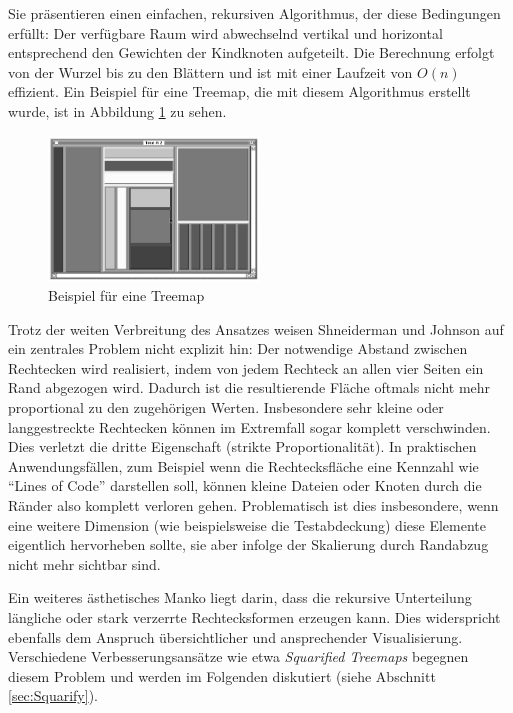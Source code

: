 Sie präsentieren einen einfachen, rekursiven Algorithmus, der diese Bedingungen erfüllt: Der verfügbare Raum wird abwechselnd vertikal und horizontal entsprechend den Gewichten der Kindknoten aufgeteilt. Die Berechnung erfolgt von der Wurzel bis zu den Blättern und ist mit einer Laufzeit von $O(n)$ effizient. Ein Beispiel für eine Treemap, die mit diesem Algorithmus erstellt wurde, ist in Abbildung \ref{fig:nestedTreemap} zu sehen.

\begin{figure}[ht]
    \centering
    \includegraphics[width=0.5\textwidth]{images/nestedTreemapDiagramm.png}
    \caption{Beispiel für eine Treemap}
    \label{fig:nestedTreemap}
\end{figure}

Trotz der weiten Verbreitung des Ansatzes weisen Shneiderman und Johnson auf ein zentrales Problem nicht explizit hin: Der notwendige Abstand zwischen Rechtecken wird realisiert, indem von jedem Rechteck an allen vier Seiten ein Rand abgezogen wird. Dadurch ist die resultierende Fläche oftmals nicht mehr proportional zu den zugehörigen Werten. Insbesondere sehr kleine oder langgestreckte Rechtecken können im Extremfall sogar komplett verschwinden. Dies verletzt die dritte Eigenschaft (strikte Proportionalität). In praktischen Anwendungsfällen, zum Beispiel wenn die Rechtecksfläche eine Kennzahl wie \enquote{Lines of Code} darstellen soll, können kleine Dateien oder Knoten durch die Ränder also komplett verloren gehen. Problematisch ist dies insbesondere, wenn eine weitere Dimension (wie beispielsweise die Testabdeckung) diese Elemente eigentlich hervorheben sollte, sie aber infolge der Skalierung durch Randabzug nicht mehr sichtbar sind.

Ein weiteres ästhetisches Manko liegt darin, dass die rekursive Unterteilung längliche oder stark verzerrte Rechtecksformen erzeugen kann. Dies widerspricht ebenfalls dem Anspruch übersichtlicher und ansprechender Visualisierung. Verschiedene Verbesserungsansätze wie etwa \textit{Squarified Treemaps} begegnen diesem Problem und werden im Folgenden diskutiert (siehe Abschnitt \ref{sec:Squarify}).

